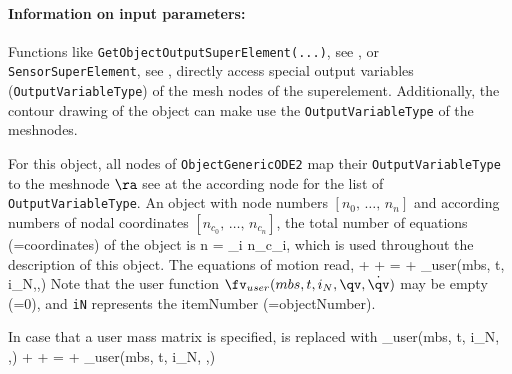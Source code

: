 \paragraph{Information on input parameters:} 
\finishTable
 \noindent
    Functions like \texttt{GetObjectOutputSuperElement(...)}, see , 
    or \texttt{SensorSuperElement}, see , directly access special output variables
    (\texttt{OutputVariableType}) of the mesh nodes of the superelement.
    Additionally, the contour drawing of the object can make use the \texttt{OutputVariableType} of the meshnodes.

    For this object, all nodes of \texttt{ObjectGenericODE2} map their \texttt{OutputVariableType} to the meshnode $\ra$
    see at the according node for the list of \texttt{OutputVariableType}.
    An object with node numbers $[n_0,\,\ldots,\,n_n]$ and according numbers of nodal coordinates $[n_{c_0},\,\ldots,\,n_{c_n}]$, the total number of equations (=coordinates) of the object is
    \be
      n = \sum_{i} n_{c_i},
    \ee
    which is used throughout the description of this object.
    The equations of motion read,
    \be \label{eq_ObjectGenericODE2_EOM}
      \Mm \ddot \qv + \Dm \dot \qv + \Km \qv = \fv + \fv_{user}(mbs, t, i_N,\qv,\dot \qv)
    \ee
    Note that the user function $\fv_{user}(mbs, t, i_N,\qv,\dot \qv)$ may be empty (=0), and \texttt{iN} represents the itemNumber (=objectNumber). 
    
    In case that a user mass matrix is specified,  is replaced with
    \be
      \Mm_{user}(mbs, t, i_N, \qv,\dot \qv) \ddot \qv + \Dm \dot \qv + \Km \qv = \fv + \fv_{user}(mbs, t, i_N, \qv,\dot \qv)
    \ee


